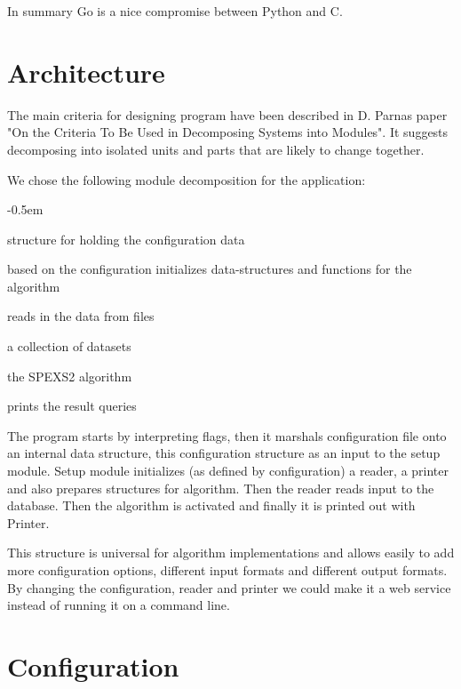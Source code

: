 In summary Go is a nice compromise between Python and C.

\section{Architecture}

The main criteria for designing program have been described in D. Parnas
paper "On the Criteria To Be Used in Decomposing Systems into Modules"\cite{Parnas72}. It suggests decomposing into isolated units and parts that are likely to change together.

We chose the following module decomposition for the application:

\begin{small}
\begin{description}
    \itemsep-0.5em
    \item[Configuration] structure for holding the configuration data
    \item[Setup] based on the configuration initializes data-structures and functions for the algorithm
    \item[Reader] reads in the data from files
    \item[Database] a collection of datasets
    \item[Algorithm] the SPEXS2 algorithm
    \item[Printer] prints the result queries
\end{description}
\end{small}

The program starts by interpreting flags, then it marshals configuration file onto an internal data structure, this configuration structure as an input to the setup module. Setup module initializes (as defined by configuration) a reader, a printer and also prepares structures for algorithm. Then the reader reads input to the database. Then the algorithm is activated and finally it is printed out with Printer.

This structure is universal for algorithm implementations and allows easily to add more configuration options, different input formats and different output formats. By changing the configuration, reader and printer we could make it a web service instead of running it on a command line.

\section{Configuration}

